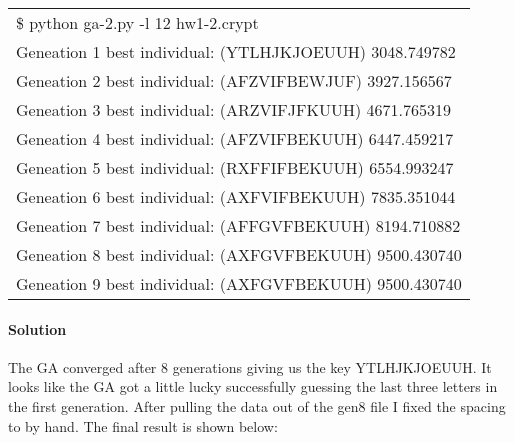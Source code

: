 \documentclass{article}
\begin{document}
\begin{enumerate}
  \begin{center}
    \begin{tabular}{l}
      \$ python ga-2.py -l 12 hw1-2.crypt\\
      Geneation 1 best individual: (YTLHJKJOEUUH) 3048.749782 \\
      Geneation 2 best individual: (AFZVIFBEWJUF) 3927.156567 \\
      Geneation 3 best individual: (ARZVIFJFKUUH) 4671.765319 \\
      Geneation 4 best individual: (AFZVIFBEKUUH) 6447.459217 \\
      Geneation 5 best individual: (RXFFIFBEKUUH) 6554.993247 \\
      Geneation 6 best individual: (AXFVIFBEKUUH) 7835.351044 \\
      Geneation 7 best individual: (AFFGVFBEKUUH) 8194.710882 \\
      Geneation 8 best individual: (AXFGVFBEKUUH) 9500.430740 \\
      Geneation 9 best individual: (AXFGVFBEKUUH) 9500.430740\\
    \end{tabular}
  \end{center}
  
  \paragraph{Solution}{The GA converged after 8 generations giving us the key YTLHJKJOEUUH. It looks like the GA got a little lucky successfully guessing the last three letters in the first generation. After pulling the data out of the gen8 file I fixed the spacing to by hand. The final result is shown below:}


\end{enumerate}
\end{document}
